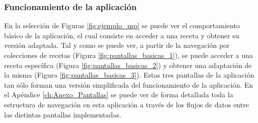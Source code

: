 \subsubsection{Funcionamiento de la aplicación}
En la selección de Figuras \ref{fig:ejemplo_uso} se puede ver el comportamiento básico de la aplicación, el cual consiste en acceder a una receta y obtener su versión adaptada. Tal y como se puede ver, a partir de la navegación por colecciones de recetas (Figura \ref{fig:pantallas_basicas_1}), se puede acceder a una receta específica (Figura \ref{fig:pantallas_basicas_2}) y obtener una adaptación de la misma (Figura \ref{fig:pantallas_basicas_3}). Estas tres pantallas de la aplicación tan sólo forman una versión simplificada del funcionamiento de la aplicación. En el Apéndice \ref{ch:Anexo_Pantallas} se puede ver de forma detallada toda la estructura de navegación en esta aplicación a través de los flujos de datos entre las distintas pantallas implementadas. 


